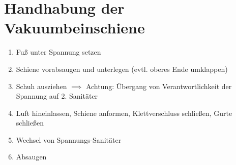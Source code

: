 \chapter{Handhabung der Vakuumbeinschiene}
\begin{enumerate}
    \item Fuß unter Spannung setzen
    \item Schiene vorabsaugen und unterlegen (evtl. oberes Ende umklappen)
    \item Schuh ausziehen $\implies$ Achtung: Übergang von Verantwortlichkeit der Spannung auf 2. Sanitäter
    \item Luft hineinlassen, Schiene anformen, Klettverschluss schließen, Gurte schließen
    \item Wechsel von Spannungs-Sanitäter
    \item Absaugen
\end{enumerate}